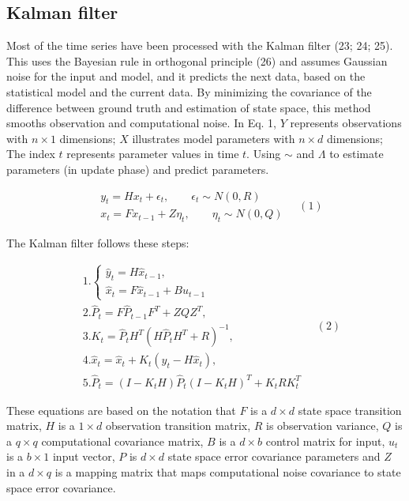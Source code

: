 \documentclass[12pt,a4paper]{article}
\begin{document}
	\subsection{Kalman filter}
	
	Most of the time series have been processed with the Kalman filter (23; 24; 25). This uses the Bayesian rule in orthogonal principle (26) and assumes Gaussian noise for the input and model, and it predicts the next data, based on the statistical model and the current data. By minimizing the covariance of the difference between ground truth and estimation of state space, this method smooths observation and computational noise. In Eq. 1, \(Y\) represents observations with \(n \times 1\) dimensions; \(X\) illustrates model parameters with \(n \times d\) dimensions; The index \(t\) represents parameter values in time \(t\). Using \(\sim\) and \(\Lambda\) to estimate parameters (in update phase) and predict parameters.
	
	\begin{equation}
		\begin{array}{rl} 
			& y_t = Hx_t + \epsilon_t,\qquad \epsilon_t\sim N(0,R)\\
			& x_t = Fx_{t - 1} + Z\eta_t,\qquad \eta_t\sim N(0,Q) 
		\end{array} \quad (1)
	\end{equation}
	
	The Kalman filter follows these steps:
	
	\begin{equation}
		\begin{array}{rl} 
			& 1.\left\{ \begin{array}{ll}\hat{y}_t = H\hat{x}_{t - 1},\\
				\hat{x}_t = F\hat{x}_{t - 1} + Bu_{t - 1} \end{array} \right.\\
			& 2.\hat{P}_t = F\hat{P}_{t - 1}F^T + ZQZ^T,\\
			& 3.K_t = \hat{P}_tH^T (H\hat{P}_tH^T +R)^{- 1},\\
			& 4.\hat{x}_t = \hat{x}_t + K_t(y_t - H\hat{x}_t),\\
			& 5.\hat{P}_t = (I - K_tH)\hat{P}_t(I - K_tH)^T +K_tRK_t^T 
		\end{array} \quad (2)
	\end{equation}
	
	These equations are based on the notation that \(F\) is a \(d \times d\) state space transition matrix, \(H\) is a \(1 \times d\) observation transition matrix, \(R\) is observation variance, \(Q\) is a \(q \times q\) computational covariance matrix, \(B\) is a \(d \times b\) control matrix for input, \(u_t\) is a \(b \times 1\) input vector, \(P\) is \(d \times d\) state space error covariance parameters and \(Z\) in a \(d \times q\) is a mapping matrix that maps computational noise covariance to state space error covariance.
	
\end{document}

